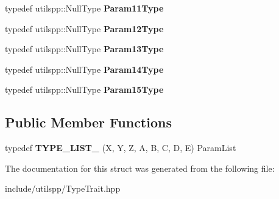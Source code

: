 \begin{DoxyCompactItemize}
\item 
\hypertarget{structutilspp_1_1PointerOnMemberFunction_3_01W_07V_1_1_5_08_07X_00_01Y_00_01Z_00_01A_00_01B_00_01C_00_01D_00_01E_08_4_ab58e46045516488fadbd48c4f6a67d55}{typedef utilspp\-::\-Null\-Type {\bfseries Param11\-Type}}\label{structutilspp_1_1PointerOnMemberFunction_3_01W_07V_1_1_5_08_07X_00_01Y_00_01Z_00_01A_00_01B_00_01C_00_01D_00_01E_08_4_ab58e46045516488fadbd48c4f6a67d55}

\item 
\hypertarget{structutilspp_1_1PointerOnMemberFunction_3_01W_07V_1_1_5_08_07X_00_01Y_00_01Z_00_01A_00_01B_00_01C_00_01D_00_01E_08_4_a834cef8c897b05c05f00f5ea62684d27}{typedef utilspp\-::\-Null\-Type {\bfseries Param12\-Type}}\label{structutilspp_1_1PointerOnMemberFunction_3_01W_07V_1_1_5_08_07X_00_01Y_00_01Z_00_01A_00_01B_00_01C_00_01D_00_01E_08_4_a834cef8c897b05c05f00f5ea62684d27}

\item 
\hypertarget{structutilspp_1_1PointerOnMemberFunction_3_01W_07V_1_1_5_08_07X_00_01Y_00_01Z_00_01A_00_01B_00_01C_00_01D_00_01E_08_4_a0b4549a12c56b0a7d2b83329f78ea0c1}{typedef utilspp\-::\-Null\-Type {\bfseries Param13\-Type}}\label{structutilspp_1_1PointerOnMemberFunction_3_01W_07V_1_1_5_08_07X_00_01Y_00_01Z_00_01A_00_01B_00_01C_00_01D_00_01E_08_4_a0b4549a12c56b0a7d2b83329f78ea0c1}

\item 
\hypertarget{structutilspp_1_1PointerOnMemberFunction_3_01W_07V_1_1_5_08_07X_00_01Y_00_01Z_00_01A_00_01B_00_01C_00_01D_00_01E_08_4_ac49821c50ca1535b253c8e8bcc72e57c}{typedef utilspp\-::\-Null\-Type {\bfseries Param14\-Type}}\label{structutilspp_1_1PointerOnMemberFunction_3_01W_07V_1_1_5_08_07X_00_01Y_00_01Z_00_01A_00_01B_00_01C_00_01D_00_01E_08_4_ac49821c50ca1535b253c8e8bcc72e57c}

\item 
\hypertarget{structutilspp_1_1PointerOnMemberFunction_3_01W_07V_1_1_5_08_07X_00_01Y_00_01Z_00_01A_00_01B_00_01C_00_01D_00_01E_08_4_a3ceac8878ec69f57192bc65c1c1854ed}{typedef utilspp\-::\-Null\-Type {\bfseries Param15\-Type}}\label{structutilspp_1_1PointerOnMemberFunction_3_01W_07V_1_1_5_08_07X_00_01Y_00_01Z_00_01A_00_01B_00_01C_00_01D_00_01E_08_4_a3ceac8878ec69f57192bc65c1c1854ed}

\end{DoxyCompactItemize}
\subsection*{Public Member Functions}
\begin{DoxyCompactItemize}
\item 
\hypertarget{structutilspp_1_1PointerOnMemberFunction_3_01W_07V_1_1_5_08_07X_00_01Y_00_01Z_00_01A_00_01B_00_01C_00_01D_00_01E_08_4_ad6f3781ed91cfe0d3a22aeb4c66eaa20}{typedef {\bfseries T\-Y\-P\-E\-\_\-\-L\-I\-S\-T\-\_} (X, Y, Z, A, B, C, D, E) Param\-List}\label{structutilspp_1_1PointerOnMemberFunction_3_01W_07V_1_1_5_08_07X_00_01Y_00_01Z_00_01A_00_01B_00_01C_00_01D_00_01E_08_4_ad6f3781ed91cfe0d3a22aeb4c66eaa20}

\end{DoxyCompactItemize}


The documentation for this struct was generated from the following file\-:\begin{DoxyCompactItemize}
\item 
include/utilspp/Type\-Trait.\-hpp\end{DoxyCompactItemize}
